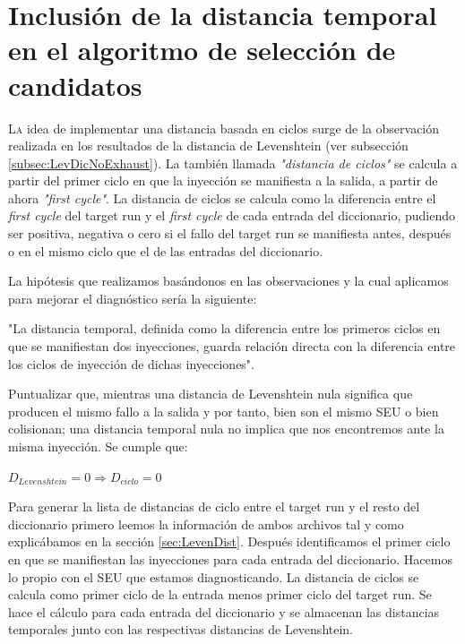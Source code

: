 \chapter{Inclusión de la distancia temporal en el algoritmo de selección de
candidatos}
\label{ch:Cycle}

\lettrine[lraise=-0.1, lines=2, loversize=0.2]{L}{a} idea de implementar una
distancia basada en ciclos surge de la observación realizada en los resultados de
la distancia de Levenshtein (ver subsección \ref{subsec:LevDicNoExhaust}). La
también llamada \textit{"distancia de ciclos"} se calcula a partir del primer 
ciclo en que la inyección se manifiesta a la salida, a partir de ahora 
\textit{"first cycle"}. La distancia de ciclos se calcula como la diferencia 
entre el \textit{first cycle} del target run y el \textit{first cycle} de cada 
entrada del diccionario, pudiendo ser positiva, negativa o cero si el fallo del 
target run se manifiesta antes, después o en el mismo ciclo que el de las 
entradas del diccionario.

La hipótesis que realizamos basándonos en las observaciones y la cual aplicamos
para mejorar el diagnóstico sería la siguiente:
\begin{hypothesis}\label{hyp:cycle}
    "La distancia temporal, definida como la diferencia entre los primeros ciclos
    en que se manifiestan dos inyecciones, guarda relación directa con la
    diferencia entre los ciclos de inyección de dichas inyecciones".
\end{hypothesis}

Puntualizar que, mientras una distancia de Levenshtein nula significa que 
producen el mismo fallo a la salida y por tanto, bien son el mismo \gls{SEU} o 
bien colisionan; una distancia temporal nula no implica que nos encontremos ante
la misma inyección. Se cumple que:
\begin{center}
    $D_{Levenshtein} = 0 \Rightarrow D_{ciclo} = 0$
\end{center}

Para generar la lista de distancias de ciclo entre el target run y el resto del
diccionario primero leemos la información de ambos archivos tal y como
explicábamos en la sección \ref{sec:LevenDist}. Después identificamos el primer
ciclo en que se manifiestan las inyecciones para cada entrada del diccionario.
Hacemos lo propio con el \gls{SEU} que estamos diagnosticando. La distancia de
ciclos se calcula como primer ciclo de la entrada menos primer ciclo del target
run. Se hace el cálculo para cada entrada del diccionario y se almacenan las
distancias temporales junto con las respectivas distancias de Levenshtein.

